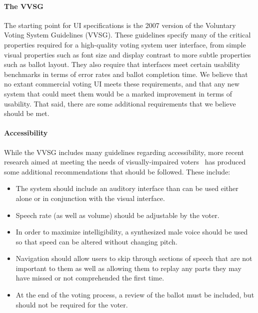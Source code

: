 \paragraph{The VVSG}
The starting point for UI specifications is the 2007 version of the Voluntary Voting System Guidelines (VVSG). These guidelines specify many of the critical properties required for a high-quality voting system user interface, from simple visual properties such as font size and display contrast to more subtle properties such as ballot layout. They also require that interfaces meet certain usability benchmarks in terms of error rates and ballot completion time. We believe that no extant commercial voting UI meets these requirements, and that any new system that could meet them would be a marked improvement in terms of usability. That said, there are some additional requirements that we believe should be met. 
\paragraph{Accessibility}
While the VVSG includes many guidelines regarding accessibility, more recent research aimed at meeting the needs of visually-impaired voters~\cite{piner-11} has produced some additional recommendations that should be followed. These include:
\begin{itemize}
\item  The system should include an auditory interface than can be used either alone or in conjunction with the visual interface. 
\item Speech rate (as well as volume) should be adjustable by the voter. 
\item In order to maximize intelligibility, a synthesized male voice should be used so that speed can be altered without changing pitch. 
\item Navigation should allow users to skip through sections of speech that are not important to them as well as allowing them to replay any parts they may have missed or not comprehended the first time.
\item At the end of the voting process, a review of the ballot must be included, but should not be required for the voter. 
\end{itemize}

